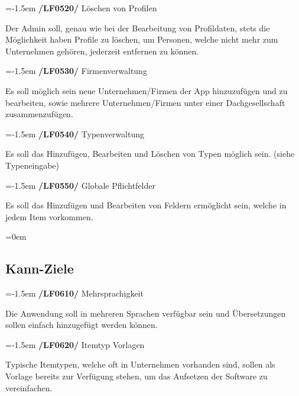 \documentclass[11pt,a4paper]{report}
\begin{document}
\leftskip=-1.5em
\textbf{/LF0520/} Löschen von Profilen
\par
\begingroup
\leftskip=1cm
\noindent Der Admin soll, genau wie bei der Bearbeitung von Profildaten, stets die Möglichkeit haben Profile zu löschen, um Personen, welche nicht mehr zum Unternehmen gehören, jederzeit entfernen zu können.\\
\par
\endgroup

\leftskip=-1.5em
\textbf{/LF0530/} Firmenverwaltung
\par
\begingroup
\leftskip=1cm
\noindent Es soll möglich sein neue Unternehmen/Firmen der App hinzuzufügen und zu bearbeiten, sowie mehrere Unternehmen/Firmen unter einer Dachgesellschaft zusammenzufügen.\\
\par
\endgroup

\leftskip=-1.5em
\textbf{/LF0540/} Typenverwaltung
\par
\begingroup
\leftskip=1cm
\noindent Es soll das Hinzufügen, Bearbeiten und Löschen von Typen möglich sein. (siehe Typeneingabe)\\
\par
\endgroup

\leftskip=-1.5em
\textbf{/LF0550/} Globale Pflichtfelder
\par
\begingroup
\leftskip=1cm
\noindent Es soll das Hinzufügen und Bearbeiten von Feldern ermöglicht sein, welche in jedem Item vorkommen.\\
\par
\endgroup

\leftskip=0em
\subsection{Kann-Ziele}



\leftskip=-1.5em
\textbf{/LF0610/} Mehrsprachigkeit
\par
\begingroup
\leftskip=1cm
\noindent Die Anwendung soll in mehreren Sprachen verfügbar sein und Übersetzungen sollen einfach hinzugefügt werden können.\\
\par
\endgroup

\leftskip=-1.5em
\textbf{/LF0620/} Itemtyp Vorlagen
\par
\begingroup
\leftskip=1cm
\noindent Typische Itemtypen, welche oft in Unternehmen vorhanden sind,
sollen als Vorlage bereits zur Verfügung stehen, um das Aufsetzen der Software zu vereinfachen.\\
\par
\endgroup
\end{document}
